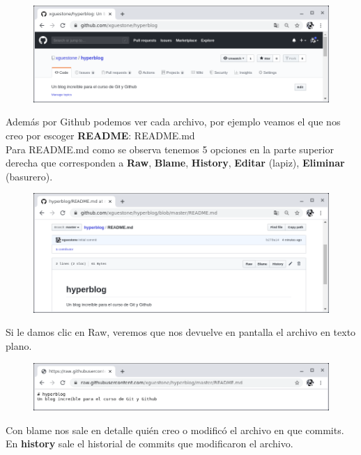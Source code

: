 \documentclass{article}
\begin{document}
\begin{figure}[h!]
  \centering
  \includegraphics[scale=0.75]{./Pictures/186_repositorio.png}
\end{figure}

Además por Github podemos ver cada archivo, por ejemplo veamos el que nos creo
por escoger \textbf{README}: README.md\\

Para README.md como se observa tenemos 5 opciones en la parte superior derecha
que corresponden a \textbf{Raw}, \textbf{Blame}, \textbf{History},
\textbf{Editar} (lapiz), \textbf{Eliminar} (basurero).\\

\begin{figure}[h!]
  \centering
  \includegraphics[scale=0.75]{./Pictures/187_repositorio.png}
\end{figure}

Si le damos clic en Raw, veremos que nos devuelve en pantalla el archivo en
texto plano.

\begin{figure}[h!]
  \centering
  \includegraphics[scale=0.75]{./Pictures/187_repo_raw.png}
\end{figure}

Con blame nos sale en detalle quién creo o modificó el archivo en que commits.
En \textbf{history} sale el historial de commits que modificaron el archivo.\\
\end{document}
